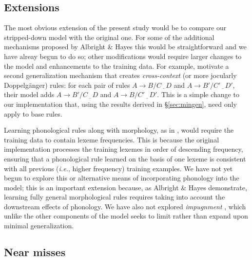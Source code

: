\documentclass[11pt]{article}
\begin{document}
\subsection{Extensions}

The most obvious extension of the present study would be to compare our stripped-down model with the original one. For some of the additional mechanisms proposed by Albright \& Hayes this would be straightforward and we have alreay begun to do so; other modifications would require larger changes to the model and enhancements to the training data. For example, \citet[][\S3.4]{albright-hayes-2002-modeling} motivate a second generalization mechanism that creates \emph{cross-context} (or more jocularly Doppelg\"anger) rules: for each pair of rules $A \to B / C \underline{\ \ \ } D$ and $A \to B' / C' \underline{\ \ \ } D'$, their model adds $A \to B' / C \underline{\ \ \ } D$ and $A \to B / C' \underline{\ \ \ } D'$. This is a simple change to our implementation that, using the results derived in \S\ref{sec:mingen}, need only apply to base rules.

Learning phonological rules along with morphology, as in \citet[][\S3.3]{albright-hayes-2002-modeling}, would require the training data to contain lexeme frequencies. This is because the original implementation processes the training lexemes in order of descending frequency, ensuring that a phonological rule learned on the basis of one lexeme is consistent with all previous (\emph{i.e.}, higher frequency) training examples. We have not yet begun to explore this or alternative means of incorporating phonology into the model; this is an important extension because, as Albright \& Hayes demonstrate, learning fully general morphological rules requires taking into account the downstream effects of phonology. We have also not explored \emph{impugnment} \citep[][\S3.7]{albright-hayes-2002-modeling}, which unlike the other components of the model seeks to limit rather than expand upon minimal generalization.



\subsection{Near misses}
\end{document}
